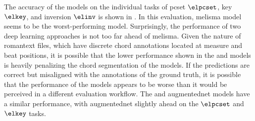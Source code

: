 

The accuracy of the models on the individual tasks of
\gls{pcset} $\elpcset$, key $\elkey$, and inversion $\elinv$
is shown in . In this evaluation,
\gls{melisma} model seems to be the worst-performing model.
Surprisingly, the performance of two deep learning
approaches is not too far ahead of \gls{melisma}. Given the
nature of \gls{romantext} files, which have discrete chord
annotations located at measure and beat positions, it is
possible that the lower performance shown in the
\textcite{mcleod2021modular} and \textcite{chen2021attend}
models is heavily penalizing the chord segmentation of the
models. If the predictions are correct but misaligned with
the annotations of the ground truth, it is possible that the
performance of the models appears to be worse than it would
be perceived in a different evaluation workflow. The
\textcite{micchi2021deep} and \gls{augmentednet} models have
a similar performance, with \gls{augmentednet} slightly
ahead on the $\elpcset$ and $\elkey$ tasks.

